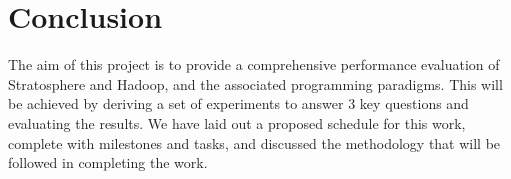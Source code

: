 \section{Conclusion}
The aim of this project is to provide a comprehensive performance evaluation of Stratosphere and Hadoop, and the associated programming paradigms. This will be achieved by deriving a set of experiments to answer 3 key questions and evaluating the results. We have laid out a proposed schedule for this work, complete with milestones and tasks, and discussed the methodology that will be followed in completing the work.
